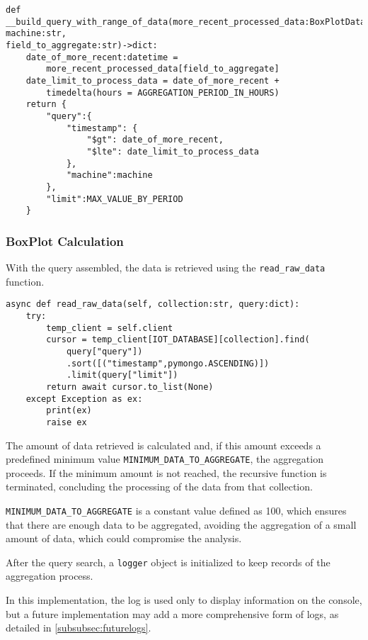 \begin{Verbatim}[fontsize=\small, baselinestretch=0.8]
def __build_query_with_range_of_data(more_recent_processed_data:BoxPlotData,
machine:str,
field_to_aggregate:str)->dict:
    date_of_more_recent:datetime = 
        more_recent_processed_data[field_to_aggregate]
    date_limit_to_process_data = date_of_more_recent + 
        timedelta(hours = AGGREGATION_PERIOD_IN_HOURS)
    return {
        "query":{
            "timestamp": {
                "$gt": date_of_more_recent,
                "$lte": date_limit_to_process_data
            },
            "machine":machine
        },
        "limit":MAX_VALUE_BY_PERIOD
    }
\end{Verbatim}

\subsubsection{BoxPlot Calculation}
With the query assembled, the data is retrieved using the \texttt{read\_raw\_data} function.

\begin{Verbatim}[fontsize=\small, baselinestretch=0.8]
async def read_raw_data(self, collection:str, query:dict):
    try:
        temp_client = self.client
        cursor = temp_client[IOT_DATABASE][collection].find(
            query["query"])
            .sort([("timestamp",pymongo.ASCENDING)])
            .limit(query["limit"])
        return await cursor.to_list(None)
    except Exception as ex:
        print(ex)
        raise ex
\end{Verbatim}

The amount of data retrieved is calculated and, if this amount exceeds a predefined minimum value \texttt{MINIMUM\_DATA\_TO\_AGGREGATE}, the aggregation proceeds. If the minimum amount is not reached, the recursive function is terminated, concluding the processing of the data from that collection.

\texttt{MINIMUM\_DATA\_TO\_AGGREGATE} is a constant value defined as 100, which ensures that there are enough data to be aggregated, avoiding the aggregation of a small amount of data, which could compromise the analysis.

After the query search, a \texttt{logger} object is initialized to keep records of the aggregation process.

In this implementation, the log is used only to display information on the console, but a future implementation may add a more comprehensive form of logs, as detailed in \ref{subsubsec:futurelogs}.

